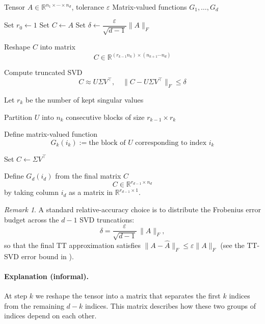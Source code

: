 \documentclass[11pt,a4paper,parskip=half-]{scrartcl}
\theoremstyle{definition}
\theoremstyle{plain}
\theoremstyle{remark}
\newtheorem{remark}{Remark}[section]
\begin{document}
\begin{algorithm}[ht]
  \caption{TT-SVD in matrix-valued function notation}
  \label{alg:ttsvd}
  \begin{algorithmic}[1]
    \Require Tensor $A \in \mathbb{R}^{n_1 \times \cdots \times n_d}$, tolerance
    $\varepsilon$
    \Ensure Matrix-valued functions $G_1,\dots,G_d$

    \State Set $r_0 \gets 1$
    \State Set $C \gets A$
    \State Set $\delta \gets \dfrac{\varepsilon}{\sqrt{d-1}} \|A\|_F$


    \State Reshape $C$ into matrix
    \[
      C \in
      \mathbb{R}^{(r_{k-1} n_k) \times (n_{k+1}\cdots n_d)}
    \]

    \State Compute truncated SVD
    \[
      C \approx U \Sigma V^\top,
      \quad
      \|C-U\Sigma V^\top\|_F \le \delta
    \]

    \State Let $r_k$ be the number of kept singular values

    \State Partition $U$ into $n_k$ consecutive blocks of size
    $r_{k-1} \times r_k$

    \State Define matrix-valued function
    \[
      G_k(i_k) :=
      \text{the block of $U$ corresponding to index $i_k$}
    \]

    \State Set $C \gets \Sigma V^\top$

    \EndFor

    \State Define $G_d(i_d)$ from the final matrix $C$
    \[
      C \in \mathbb{R}^{r_{d-1} \times n_d}
    \]
    by taking column $i_d$ as a matrix in $\mathbb{R}^{r_{d-1}\times 1}$.

  \end{algorithmic}
\end{algorithm}

\begin{remark}
  A standard relative-accuracy choice is to distribute the Frobenius error
  budget across the $d-1$ SVD truncations:
  \[
    \delta = \frac{\varepsilon}{\sqrt{d-1}}\,\|A\|_F,
  \]
  so that the final TT approximation satisfies $\|A-\widehat{A}\|_F
  \le \varepsilon\|A\|_F$
  (see the TT-SVD error bound in \cite{Oseledets2011TT}).
\end{remark}

\paragraph{Explanation (informal).}
At step $k$ we reshape the tensor into a matrix that separates
the first $k$ indices from the remaining $d-k$ indices.
This matrix describes how these two groups of indices
depend on each other.
\end{document}
